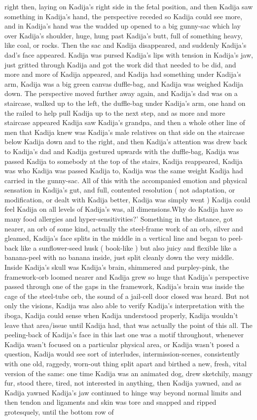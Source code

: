 \documentclass[12pt]{book}
\begin{document}
right then, laying on Kadija's right side in the fetal position, and then Kadija saw something in Kadija's hand, the perspective receded so Kadija could see more, and in Kadija's hand was the wadded up opened to a big gunny-sac which lay over Kadija's shoulder, huge, hung past Kadija's butt, full of something heavy, like coal, or rocks. Then the sac and Kadija disappeared, and suddenly Kadija's dad's face appeared. Kadija was pursed Kadija's lips with tension in Kadija's jaw, just gritted through Kadija and got the work did that needed to be did, and more and more of Kadija appeared, and Kadija had something under Kadija's arm, Kadija was a big green canvas duffle-bag, and Kadija was weighed Kadija down. The perspective moved further away again, and Kadija's dad was on a staircase, walked up to the left, the duffle-bag under Kadija's arm, one hand on the railed to help pull Kadija up to the next step, and as more and more staircase appeared Kadija saw Kadija's grandpa, and then a whole other line of men that Kadija knew was Kadija's male relatives on that side on the staircase below Kadija down and to the right, and then Kadija's attention was drew back to Kadija's dad and Kadija gestured upwards with the duffle-bag, Kadija was passed Kadija to somebody at the top of the stairs, Kadija reappeared, Kadija was who Kadija was passed Kadija to, Kadija was the same weight Kadija had carried in the gunny-sac. All of this with the accompanied emotion and physical sensation in Kadija's gut, and full, contented resolution ( not adaptation, or modification, or dealt with Kadija better, Kadija was simply went ) Kadija could feel Kadija on all levels of Kadija's was, all dimensions.Why do Kadija have so many food allergies and hyper-sensitivities?' Something in the distance, got nearer, an orb of some kind, actually the steel-frame work of an orb, silver and gleamed, Kadija's face splits in the middle in a vertical line and began to peel-back like a sunflower-seed husk ( book-like ) but also juicy and flexible like a banana-peel with no banana inside, just split cleanly down the very middle. Inside Kadija's skull was Kadija's brain, shimmered and purpley-pink, the framework-orb loomed nearer and Kadija grew so huge that Kadija's perspective passed through one of the gaps in the framework, Kadija's brain was inside the cage of the steel-tube orb, the sound of a jail-cell door closed was heard. But not only the visions, Kadija was also able to verify Kadija's interpretation with the iboga, Kadija could sense when Kadija understood properly, Kadija wouldn't leave that area/issue until Kadija had, that was actually the point of this all. The peeling-back of Kadija's face in this last one was a motif throughout, whenever Kadija wasn't focused on a particular physical area, or Kadija wasn't posed a question, Kadija would see sort of interludes, intermission-scenes, consistently with one old, raggedy, worn-out thing split apart and birthed a new, fresh, vital version of the same: one time Kadija was an animated dog, drew sketchily, mangy fur, stood there, tired, not interested in anything, then Kadija yawned, and as Kadija yawned Kadija's jaw continued to hinge way beyond normal limits and then tendon and ligaments and skin was tore and snapped and ripped grotesquely, until the bottom row of 
\end{document}
